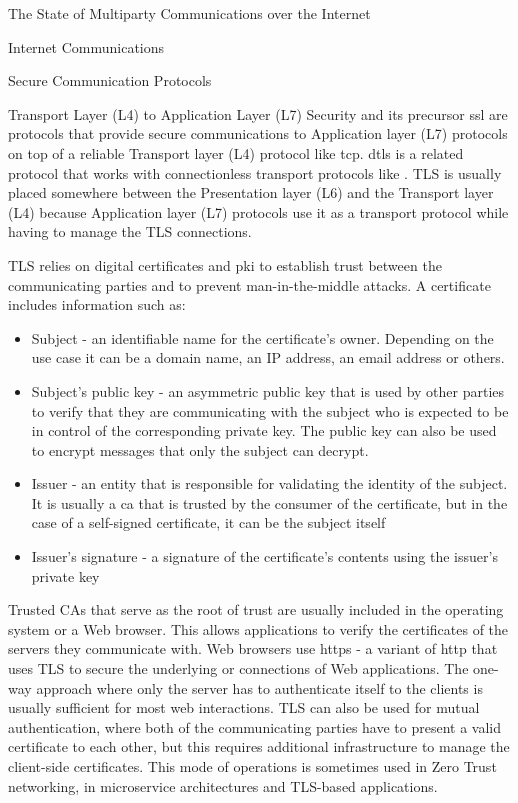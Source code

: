 \begin{frame}[fragile]{The State of Multiparty Communications over the
Internet}
\begin{block}{Internet Communications}
\begin{block}{Secure Communication Protocols}
\begin{block}{Transport Layer (L4) to Application Layer (L7) Security}
\protect\hypertarget{transport-layer-l4-to-application-layer-l7-security}{}
 \autocite{tlsRFC} and its precursor \gls{ssl} are protocols
that provide secure communications to Application layer (L7) protocols
on top of a reliable Transport layer (L4) protocol like \gls{tcp}.
\gls{dtls} is a related protocol that works with connectionless
transport protocols like . TLS is usually placed somewhere
between the Presentation layer (L6) and the Transport layer (L4) because
Application layer (L7) protocols use it as a transport protocol while
having to manage the TLS connections.

TLS relies on digital certificates and \gls{pki} to establish trust
between the communicating parties and to prevent man-in-the-middle
attacks. A certificate includes information such as:

\begin{itemize}
\tightlist
\item
  Subject - an identifiable name for the certificate's owner. Depending
  on the use case it can be a domain name, an IP address, an email
  address or others.
\item
  Subject's public key - an asymmetric public key that is used by other
  parties to verify that they are communicating with the subject who is
  expected to be in control of the corresponding private key. The public
  key can also be used to encrypt messages that only the subject can
  decrypt.
\item
  Issuer - an entity that is responsible for validating the identity of
  the subject. It is usually a \gls{ca} that is trusted by the consumer
  of the certificate, but in the case of a self-signed certificate, it
  can be the subject itself
\item
  Issuer's signature - a signature of the certificate's contents using
  the issuer's private key
\end{itemize}

Trusted CAs that serve as the root of trust are usually included in the
operating system or a Web browser. This allows applications to verify
the certificates of the servers they communicate with. Web browsers use
\gls{https} \autocite{httpsRFC} - a variant of \gls{http} that uses TLS
to secure the underlying  or  connections of Web
applications. The one-way approach where only the server has to
authenticate itself to the clients is usually sufficient for most web
interactions. TLS can also be used for mutual authentication, where both
of the communicating parties have to present a valid certificate to each
other, but this requires additional infrastructure to manage the
client-side certificates. This mode of operations is sometimes used in
Zero Trust networking, in microservice architectures and TLS-based
 applications.


\end{block}
\end{block}
\end{block}
\end{frame}
